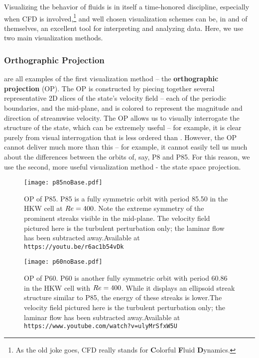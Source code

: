 Visualizing the behavior of fluids is in itself a time-honored discipline, especially when CFD is involved,\footnote{As the old joke goes, CFD really stands for {\bf C}olorful {\bf F}luid {\bf D}ynamics.} and well chosen visualization schemes can be, in and of themselves, an excellent tool for interpreting and analyzing data. Here, we use two main visualization methods.
\subsubsection{Orthographic Projection}
 are all examples of the first visualization method -- the {\bf orthographic projection} (OP). The OP is constructed by piecing together several representative 2D slices of the state's velocity field -- each of the periodic boundaries, and the mid-plane, and is colored to represent the magnitude and direction of streamwise velocity. The OP allows us to visually interrogate the structure of the state, which can be extremely useful -- for example, it is clear purely from visual interrogation that  is less ordered than . However, the OP cannot deliver much more than this -- for example, it cannot easily tell us much about the differences between the orbits of, say, P8 and P85. For this reason, we use the second, more useful visualization method - the state space projection.
\begin{figure}
\centerline{\texttt{[image: p85noBase.pdf]}}
\caption{OP of P85. P85 is a fully symmetric orbit with period 85.50 in the HKW cell at $Re=400$. Note the extreme symmetry of the prominent streaks visible in the mid-plane. The velocity field pictured here is the turbulent perturbation only; the laminar flow has been subtracted away.{Available at {\tt https://youtu.be/r6ac1b54vDk}}}\label{fig:p85}
\end{figure}

\begin{figure}
\centerline{\texttt{[image: p60noBase.pdf]}}
\caption{OP of P60. P60 is another fully symmetric orbit with period 60.86 in the HKW cell with $Re = 400$. While it displays an ellipsoid streak structure similar to P85, the energy of these streaks is lower.The velocity field pictured here is the turbulent perturbation only; the laminar flow has been subtracted away.{Available at {\tt https://www.youtube.com/watch?v=ulyMrSfxW5U}}}\label{fig:p60}
\end{figure}


